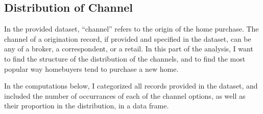 \documentclass[11pt]{article}
\begin{document}
    \hypertarget{distribution-of-channel}{%
\subsection{Distribution of Channel}\label{distribution-of-channel}}

In the provided dataset, ``channel'' refers to the origin of the home
purchase. The channel of a origination record, if provided and specified
in the dataset, can be any of a broker, a correspondent, or a retail. In
this part of the analysis, I want to find the structure of the
distribution of the channels, and to find the most popular way
homebuyers tend to purchase a new home.

In the computations below, I categorized all records provided in the
dataset, and included the number of occurrances of each of the channel
options, as well as their proportion in the distribution, in a data
frame.
\end{document}
